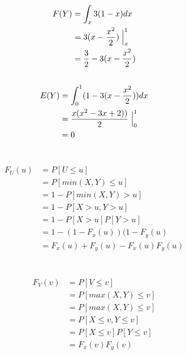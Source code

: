 \documentclass[12pt, a4paper]{article}
\begin{document}
\subsection{}
\begin{subequations}
  \begin{align}
    F(Y) &= \int_x 3(1 - x) dx \\
         &= 3(x - \frac{x^2}{2})\Bigm|_x^1\\
         &= \frac{3}{2} - 3(x - \frac{x^2}{2})
  \end{align}
\end{subequations}

\subsection{}
\begin{subequations}
  \begin{align}
    E(Y) &= \int_0^1 (1-3(x - \frac{x^2}{2})) dx \\
         &= \frac{x(x^2 - 3x + 2))}{2}\Bigm|_0^1\\
         &= 0
  \end{align}
\end{subequations}

\section{}
\begin{subequations}
  \begin{align}
    F_U(u) &= P[U \leq u]\\
           &= P[min(X,Y) \leq u]\\
           &= 1 - P[min(X,Y) > u]\\
           &= 1 - P[X > u, Y > u]\\
           &= 1 - P[X > u]P[Y > u]\\
           &= 1 - (1 - F_x(u))(1 - F_y(u)\\
           &= F_x(u)+F_y(u)-F_x(u)F_y(u)
  \end{align}
\end{subequations}


\section{}
\begin{subequations}
  \begin{align}
    F_V(v) &= P[V \leq v]\\
           &= P[max(X,Y) \leq v]\\
           &= P[max(X,Y) \leq v]\\
           &= P[X \leq v, Y \leq v]\\
           &= P[X \leq v]P[Y \leq v]\\
           &= F_x(v)F_y(v)
  \end{align}
\end{subequations}
\end{document}
